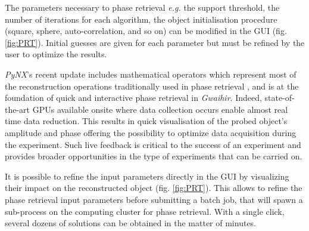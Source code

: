 
The parameters necessary to phase retrieval \parencite{fienup_phase_1982,fienup_reconstruction_1978,Marchesini2007,pynx2020operators} \textit{e.g.} the support threshold, the number of iterations for each algorithm, the object initialisation procedure (square, sphere, auto-correlation, and so on) can be modified in the GUI (fig. \ref{fig:PRT}).
Initial guesses are given for each parameter but must be refined by the user to optimize the results.

\textit{PyNX}'s recent update includes mathematical operators \parencite{pynx2020operators} which represent most of the reconstruction operations traditionally used in phase retrieval \parencite{gerchberg_practical_1972,fienup_reconstruction_1978,Marchesini2007}, and is at the foundation of quick and interactive phase retrieval in \textit{Gwaihir}.
Indeed, state-of-the-art GPUs available onsite where data collection occurs enable almost real time data reduction.
This results in quick visualisation of the probed object's amplitude and phase offering the possibility to optimize data acquisition during the experiment.
Such live feedback is critical to the success of an experiment and provides broader opportunities in the type of experiments that can be carried on.

It is possible to refine the input parameters directly in the GUI by visualizing their impact on the reconstructed object (fig. \ref{fig:PRT}).
This allows to refine the phase retrieval input parameters before submitting a batch job, that will spawn a sub-process on the computing cluster for phase retrieval.
With a single click, several dozens of solutions can be obtained in the matter of minutes.

